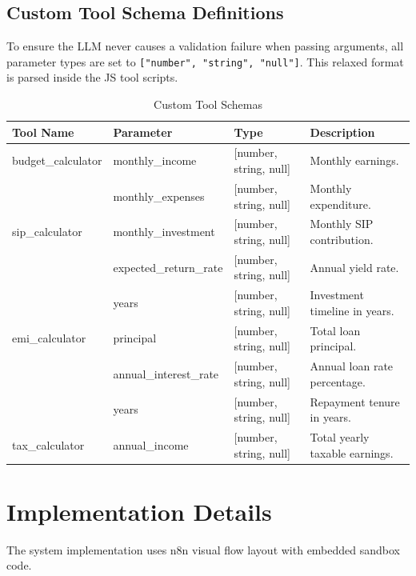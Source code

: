 \documentclass[12pt,a4paper]{report}
\begin{document}
\section{Custom Tool Schema Definitions}
To ensure the LLM never causes a validation failure when passing arguments, all parameter types are set to \texttt{["number", "string", "null"]}. This relaxed format is parsed inside the JS tool scripts.

\begin{table}[H]
    \centering
    \caption{Custom Tool Schemas}
    \begin{tabular}{lllp{6cm}}
        \toprule
        \textbf{Tool Name} & \textbf{Parameter} & \textbf{Type} & \textbf{Description} \\
        \midrule
        budget\_calculator & monthly\_income & [number, string, null] & Monthly earnings. \\
        & monthly\_expenses & [number, string, null] & Monthly expenditure. \\
        \midrule
        sip\_calculator & monthly\_investment & [number, string, null] & Monthly SIP contribution. \\
        & expected\_return\_rate & [number, string, null] & Annual yield rate. \\
        & years & [number, string, null] & Investment timeline in years. \\
        \midrule
        emi\_calculator & principal & [number, string, null] & Total loan principal. \\
        & annual\_interest\_rate & [number, string, null] & Annual loan rate percentage. \\
        & years & [number, string, null] & Repayment tenure in years. \\
        \midrule
        tax\_calculator & annual\_income & [number, string, null] & Total yearly taxable earnings. \\
        \bottomrule
    \end{tabular}
\end{table}

\clearpage
\chapter{Implementation Details}
The system implementation uses n8n visual flow layout with embedded sandbox code.
\end{document}
